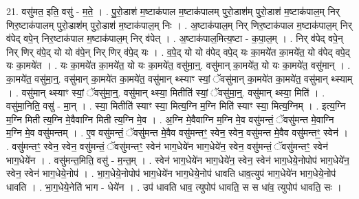\documentclass[17pt]{extarticle}
\begin{document}
21. वसु॑मत॒ इति॒ वसु॑ - म॒ते॒ । . पु॒रो॒डाश॑ म॒ष्टाक॑पाल म॒ष्टाक॑पालम् पुरो॒डाश॑म् पुरो॒डाश॑ म॒ष्टाक॑पाल॒म् निर् णिर॒ष्टाक॑पालम् पुरो॒डाश॑म् पुरो॒डाश॑ म॒ष्टाक॑पाल॒म् निः । . अ॒ष्टाक॑पाल॒म् निर् णिर॒ष्टाक॑पाल म॒ष्टाक॑पाल॒म् निर् व॑पेद् वपे॒न् निर॒ष्टाक॑पाल म॒ष्टाक॑पाल॒म् निर् व॑पेत् । . अ॒ष्टाक॑पाल॒मित्य॒ष्टा - क॒पा॒ल॒म् । . निर् व॑पेद् वपे॒न् निर् णिर् व॑पे॒द् यो यो व॑पे॒न् निर् णिर् व॑पे॒द् यः । . व॒पे॒द् यो यो व॑पेद् वपे॒द् यः का॒मये॑त का॒मये॑त॒ यो व॑पेद् वपे॒द् यः का॒मये॑त । . यः का॒मये॑त का॒मये॑त॒ यो यः का॒मये॑त॒ वसु॑मा॒न्॒. वसु॑मान् का॒मये॑त॒ यो यः का॒मये॑त॒ वसु॑मान् । . का॒मये॑त॒ वसु॑मा॒न्॒. वसु॑मान् का॒मये॑त का॒मये॑त॒ वसु॑मान् थ्स्याꣳ स्यां॒ ॅवसु॑मान् का॒मये॑त का॒मये॑त॒ वसु॑मान् थ्स्याम् । . वसु॑मान् थ्स्याꣳ स्यां॒ ॅवसु॑मा॒न्॒. वसु॑मान् थ्स्या॒ मितीति॑ स्यां॒ ॅवसु॑मा॒न्॒. वसु॑मान् थ्स्या॒ मिति॑ । . वसु॑मा॒निति॒ वसु॑ - मा॒न् । . स्या॒ मितीति॑ स्याꣳ स्या॒ मित्य॒ग्नि म॒ग्नि मिति॑ स्याꣳ स्या॒ मित्य॒ग्निम् । . इत्य॒ग्नि म॒ग्नि मिती त्य॒ग्नि मे॒वैवाग्नि मिती त्य॒ग्नि मे॒व । . अ॒ग्नि मे॒वैवाग्नि म॒ग्नि मे॒व वसु॑मन्तं॒ ॅवसु॑मन्त मे॒वाग्नि म॒ग्नि मे॒व वसु॑मन्तम् । . ए॒व वसु॑मन्तं॒ ॅवसु॑मन्त मे॒वैव वसु॑मन्तꣳ॒॒ स्वेन॒ स्वेन॒ वसु॑मन्त मे॒वैव वसु॑मन्तꣳ॒॒ स्वेन॑ । . वसु॑मन्तꣳ॒॒ स्वेन॒ स्वेन॒ वसु॑मन्तं॒ ॅवसु॑मन्तꣳ॒॒ स्वेन॑ भाग॒धेये॑न भाग॒धेये॑न॒ स्वेन॒ वसु॑मन्तं॒ ॅवसु॑मन्तꣳ॒॒ स्वेन॑ भाग॒धेये॑न । . वसु॑मन्त॒मिति॒ वसु॑ - म॒न्त॒म् । . स्वेन॑ भाग॒धेये॑न भाग॒धेये॑न॒ स्वेन॒ स्वेन॑ भाग॒धेये॒नोपोप॑ भाग॒धेये॑न॒ स्वेन॒ स्वेन॑ भाग॒धेये॒नोप॑ । . भा॒ग॒धेये॒नोपोप॑ भाग॒धेये॑न भाग॒धेये॒नोप॑ धावति धाव॒त्युप॑ भाग॒धेये॑न भाग॒धेये॒नोप॑ धावति । . भा॒ग॒धेये॒नेति॑ भाग - धेये॑न । . उप॑ धावति धाव॒ त्युपोप॑ धावति॒ स स धा॑व॒ त्युपोप॑ धावति॒ सः । \newline
\end{document}
